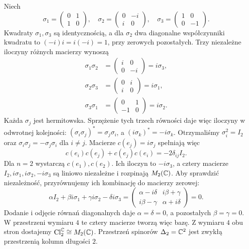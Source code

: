 \begin{przyklad}
\label{prz:pauli}
Niech
\[
 \sigma_1=\begin{pmatrix}0&1\\1&0\end{pmatrix},
 \quad
 \sigma_2=\begin{pmatrix}0&-i\\i&0\end{pmatrix},
 \quad
 \sigma_3=\begin{pmatrix}1&0\\0&-1\end{pmatrix}.
\]
Kwadraty $\sigma_1,\sigma_3$ są identycznością,
a dla $\sigma_2$ dwa diagonalne współczynniki kwadratu
to $(-i)i=i(-i)=1$, przy zerowych pozostałych.
Trzy niezależne iloczyny różnych macierzy wynoszą
\[
 \begin{aligned}
 \sigma_1\sigma_2&=\begin{pmatrix}i&0\\0&-i\end{pmatrix}
                  =i\sigma_3,\\
 \sigma_2\sigma_3&=\begin{pmatrix}0&i\\i&0\end{pmatrix}
                  =i\sigma_1,\\
 \sigma_3\sigma_1&=\begin{pmatrix}0&1\\-1&0\end{pmatrix}
                  =i\sigma_2.
 \end{aligned}
\]
Każda $\sigma_j$ jest hermitowska.
Sprzężenie tych trzech równości daje więc iloczyny w odwrotnej
kolejności: $(\sigma_i\sigma_j)^*=\sigma_j\sigma_i$,
a $(i\sigma_k)^*=-i\sigma_k$.
Otrzymaliśmy $\sigma_i^2=I_2$ oraz
$\sigma_i\sigma_j=-\sigma_j\sigma_i$ dla $i\ne j$.
Macierze $c(e_j)=i\sigma_j$ spełniają więc
\[
 c(e_i)c(e_j)+c(e_j)c(e_i)=-2\delta_{ij}I_2.
\]
Dla $n=2$ wystarczą $c(e_1),c(e_2)$.
Ich iloczyn to $-i\sigma_3$, a cztery macierze
$I_2,i\sigma_1,i\sigma_2,-i\sigma_3$
są liniowo niezależne i rozpinają
$M_2(\mathbb{C})$. Aby sprawdzić niezależność, przyrównujemy
ich kombinację do macierzy zerowej:
\[
 \alpha I_2+\beta i\sigma_1+\gamma i\sigma_2-\delta i\sigma_3
 =\begin{pmatrix}
   \alpha-i\delta&i\beta+\gamma\\
   i\beta-\gamma&\alpha+i\delta
  \end{pmatrix}=0.
\]
Dodanie i odjęcie równań diagonalnych daje
$\alpha=\delta=0$, a pozostałych $\beta=\gamma=0$.
W przestrzeni wymiaru $4$ te cztery macierze tworzą więc bazę.
Z wymiaru $4$ obu stron dostajemy
$\operatorname{Cl}^{\mathbb{C}}_2\cong M_2(\mathbb{C})$.
Przestrzeń spinorów $\Delta_2=\mathbb{C}^2$
jest zwykłą przestrzenią kolumn długości $2$.
\end{przyklad}

